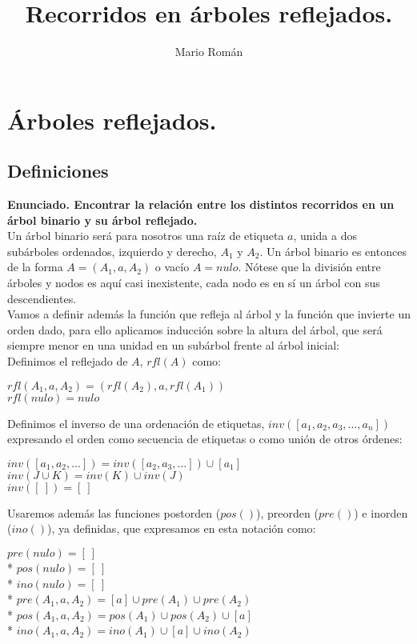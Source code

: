 \documentclass{article}
\title{Recorridos en árboles reflejados.}
\author{Mario Román}
\begin{document}
\maketitle

\section{Árboles reflejados.}
\subsection{Definiciones}
\textbf{ Enunciado. Encontrar la relación entre los distintos recorridos en un
  árbol binario y su árbol reflejado.
} \\

Un árbol binario será para nosotros una raíz de etiqueta $a$, unida
a dos subárboles ordenados, izquierdo y derecho, $A_1$ y $A_2$.
Un árbol binario es entonces de la forma $A = (A_1,a,A_2)$ o vacío $A = nulo$.
Nótese que la división entre árboles y nodos es aquí casi inexistente,
cada nodo es en sí un árbol con sus descendientes.\\
Vamos a definir además la función que refleja al árbol y la función que invierte 
un orden dado, para ello aplicamos inducción sobre la altura del árbol, que será
siempre menor en una unidad en un subárbol frente al árbol inicial:\\

Definimos el reflejado de $A$, $rfl(A)$ como:
\begin{adjustwidth}{2cm}{}
  $\displaystyle rfl(A_1,a,A_2) = \left(rfl(A_2), a, rfl(A_1)\right)$\\
  $\displaystyle rfl(nulo) = nulo$\\
\end{adjustwidth}

Definimos el inverso de una ordenación de etiquetas, $inv([a_1,a_2,a_3, \dots, a_n])$ expresando el orden
como secuencia de etiquetas o como unión de otros órdenes:
\begin{adjustwidth}{2cm}{}
  $\displaystyle inv([a_1,a_2,\dots]) = inv([a_2,a_3,\dots]) \cup [a_1]$\\
  $\displaystyle inv(J \cup K) = inv(K) \cup inv(J)$\\
  $\displaystyle inv([\ ]) = [\ ]$\\
\end{adjustwidth}

Usaremos además las funciones postorden ($pos()$), preorden ($pre()$) e inorden ($ino()$), ya definidas,
que expresamos en esta notación como: \\
\begin{adjustwidth}{2cm}{}
  $pre(nulo) = [\ ]$\\*
  $pos(nulo) = [\ ]$\\*
  $ino(nulo) = [\ ]$\\*
  $pre(A_1,a,A_2) = [a] \cup pre(A_1) \cup pre(A_2)$\\*
  $pos(A_1,a,A_2) = pos(A_1)  \cup pos(A_2) \cup [a]$\\*
  $ino(A_1,a,A_2) = ino(A_1) \cup [a] \cup ino(A_2)$\\
\end{adjustwidth}
\end{document}
